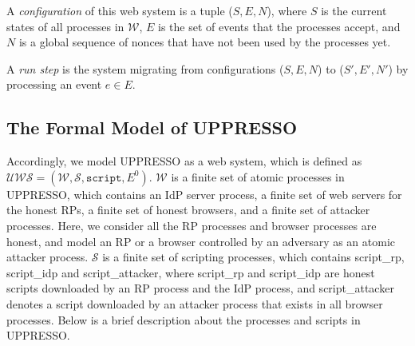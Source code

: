 \noindent A {\em configuration} of this web system is a tuple ($S, E, N$), where $S$ is the current states of all processes in $\mathcal{W}$, $E$ is the set of events that the processes accept, and $N$ is a global sequence of nonces that have not been used by the processes yet.

\noindent A {\em run step} is the system migrating from configurations ($S, E, N$) to ($S', E', N'$) by processing an event $e \in E$.

\subsection{The Formal Model of UPPRESSO}
Accordingly, we model UPPRESSO as a web system, which is defined as $\mathcal{UWS} = (\mathcal{W}, \mathcal{S}, \mathtt{script}, E^0)$. $\mathcal{W}$ is a finite set of atomic processes in UPPRESSO, which contains an IdP server process, a finite set of web servers for the honest RPs, a finite set of honest browsers, and a finite set of attacker processes. Here, we consider all the RP processes and browser processes are honest, and model an RP or a browser controlled by an adversary as an atomic attacker process.
$\mathcal{S}$ is a finite set of scripting processes, which contains {\sf script\_rp}, {\sf script\_idp} and {\sf script\_attacker}, where {\sf script\_rp} and {\sf script\_idp} are honest scripts downloaded by an RP process and the IdP process, and {\sf script\_attacker} denotes a script downloaded by an attacker process that exists in all browser processes. Below is a brief description about the processes and scripts in UPPRESSO.
\vspace{-\topsep}
